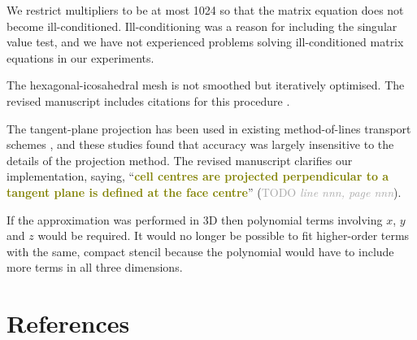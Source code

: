 \documentclass[times]{elsarticle}
\newcommand{\TODO}[1]{\textcolor{darkgray}{TODO \textit{#1}}}
\newcommand{\revthree}[1]{\textcolor{olive}{\textbf{#1}}}
\begin{document}
\begin{quotation}
\begin{comment}
\item The weighting can degrade the condition number of the least squares problem.
\end{comment}
\end{quotation}
We restrict multipliers to be at most 1024 so that the matrix equation does not become ill-conditioned.  Ill-conditioning was a reason for including the singular value test, and we have not experienced problems solving ill-conditioned matrix equations in our experiments.

\begin{quotation}
\begin{comment}
\item Is there a smoothing of hexagonal-icosahedral mesh after refinement.
\end{comment}
\end{quotation}
The hexagonal-icosahedral mesh is not smoothed but iteratively optimised.  The revised manuscript includes citations for this procedure \citep{heikes-randall1995a,heikes-randall1995b}.

\begin{quotation}
\begin{comment}
Can you comment on the projection to the tangent plane for the spherical test example. 
Note that projection to another grid can change the interpolation/approximation essentially, 
like the transformation of a boundary following grid in physical space to a Cartesian grid in 
computational space. Why is the interpolation/approximation not done in 3 dimensional 
physical space.
\end{comment}
\end{quotation}
The tangent-plane projection has been used in existing method-of-lines transport schemes \citep{lashley2002,skamarock-menchaca2010,skamarock-gassmann2011}, and these studies found that accuracy was largely insensitive to the details of the projection method.  The revised manuscript clarifies our implementation, saying, ``\revthree{cell centres are projected perpendicular to a tangent plane is defined at the face centre}'' (\TODO{line nnn, page nnn}).

If the approximation was performed in 3D then polynomial terms involving $x$, $y$ and $z$ would be required.  It would no longer be possible to fit higher-order terms with the same, compact stencil because the polynomial would have to include more terms in all three dimensions.

\section*{References}


\end{document}
